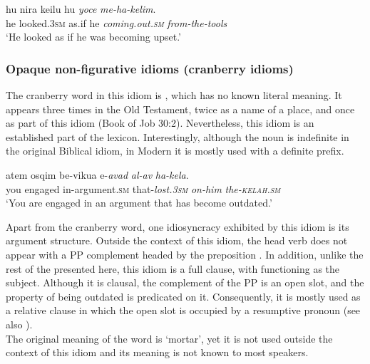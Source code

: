 \documentclass[output=paper]{langsci/langscibook}
\begin{document}
	\ea\label{she:kelim-canon}
	\gll hu nir{\alef}a ke{\alef}ilu hu \textit{yoce} \textit{me-ha-kelim}.\\
	   he looked.\textsc{3sm} as.if he \textit{coming.out.\textsc{sm}} \textit{from-the-tools}\\
	\glt `He looked as if he was becoming upset.'
	\z

\subsubsection{Opaque non-figurative idioms (cranberry idioms)}
\label{she:sec:cranberry}

\noindent{} The cranberry word in this idiom is , which has no known literal meaning. It appears three times in the Old Testament, twice as a name of a place, and once as part of this idiom (Book of Job 30:2). Nevertheless, this idiom is an established part of the  lexicon. Interestingly, although the noun  is indefinite in the original Biblical idiom, in Modern  it is mostly used with a definite prefix.

	\ea\label{she:kelax-canon}
    	\gll {\alef}atem {\ayin}osqim be-vikua{\het} {\shin}e-\textit{{\alef}avad} \textit{{\ayin}al-av} \textit{ha-kela{\het}}.\\
    	   you engaged in-argument.\textsc{sm} that-\textit{lost.\textsc{3sm}} \textit{on-him} \textit{the-\textsc{kelah}.\textsc{sm}}\\
    	\glt `You are engaged in an argument that has become outdated.'
	\z

Apart from the cranberry word, one idiosyncracy exhibited by this idiom is its argument structure. Outside the context of this idiom, the head verb  does not appear with a PP complement headed by the preposition . In addition, unlike the rest of the  presented here, this idiom is a full clause, with  functioning as the subject. Although it is clausal, the complement of the PP is an open slot, and the property of being outdated is predicated on it. Consequently, it is mostly used as a relative clause in which the open slot is occupied by a resumptive pronoun (see also ).\\


\noindent{} The original meaning of the word  is `mortar', yet it is not used outside the context of this idiom and its meaning is not known to most  speakers.
\end{document}
